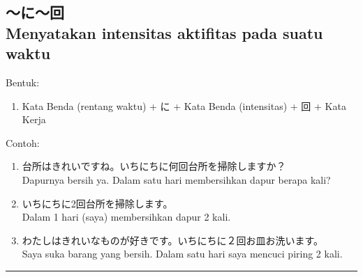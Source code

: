 \subsection*{
    ～に～回 \\
    Menyatakan intensitas aktifitas pada suatu waktu
}
Bentuk:
\begin{enumerate}
    \item Kata Benda (rentang waktu) + に + Kata Benda (intensitas)
    + 回 + Kata Kerja
\end{enumerate}
Contoh: 
\begin{enumerate}
    \item 台所はきれいですね。いちにちに何回台所を掃除しますか？
    \\ Dapurnya bersih ya. Dalam satu hari membersihkan dapur berapa kali?
    \item いちにちに2回台所を掃除します。
    \\ Dalam 1 hari (saya) membersihkan dapur 2 kali.
    \item わたしはきれいなものが好きです。いちにちに２回お皿お洗います。
    \\ Saya suka barang yang bersih. Dalam satu hari saya mencuci piring 2 kali.
\end{enumerate}

\vspace{0.2cm}\hrule height 1pt\vspace{0.2cm}


